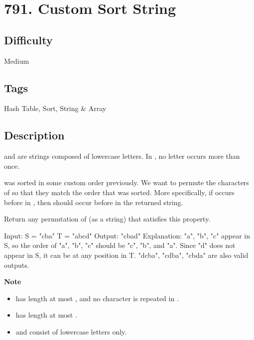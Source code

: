 \tocless\section{791. Custom Sort String}
\label{algo:791}

\subsection*{Difficulty}
Medium

\subsection*{Tags}
Hash Table, Sort, String \& Array

\subsection*{Description}
 and  are strings composed of lowercase letters. In , no letter occurs more than once.

 was sorted in some custom order previously. We want to permute the characters of  so that they match the order that  was sorted. More specifically, if  occurs before  in , then  should occur before  in the returned string.

Return any permutation of  (as a string) that satisfies this property.

\begin{example}
\begin{multilinecode}
Input:
S = "cba"
T = "abcd"
Output:
"cbad"
Explanation: 
"a", "b", "c" appear in S, so the order of "a", "b", "c" should be "c", "b", and "a". 
Since "d" does not appear in S, it can be at any position in T. "dcba", "cdba", "cbda" are also valid outputs.
\end{multilinecode}
\end{example}

\textbf{Note}
\begin{itemize}
    \item {} has length at most , and no character is repeated in .
    \item {} has length at most .
    \item {} and  consist of lowercase letters only.
\end{itemize}

